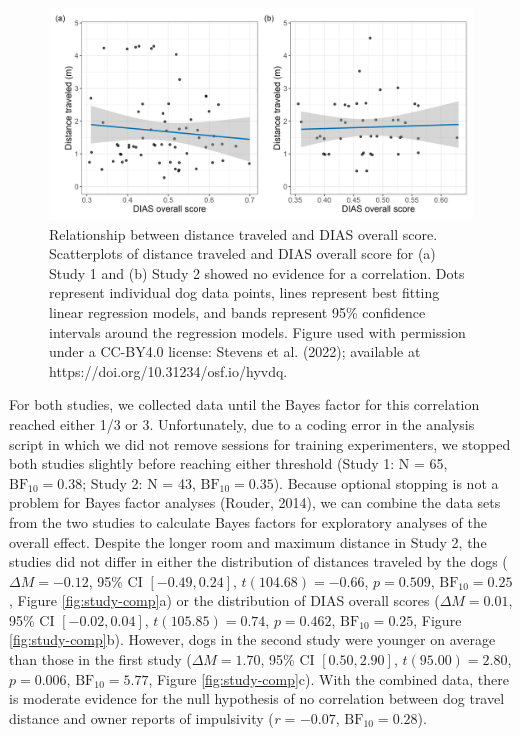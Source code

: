 \documentclass[
  pub,floatsintext]{apa6}
\begin{document}
\begin{figure}

{\centering \includegraphics[width=1\linewidth]{figures/distance_dias_overall} 

}

\caption{Relationship between distance traveled and DIAS overall score. Scatterplots of distance traveled and DIAS overall score for (a) Study 1 and (b) Study 2 showed no evidence for a correlation. Dots represent individual dog data points, lines represent best fitting linear regression models, and bands represent 95\% confidence intervals around the regression models. Figure used with permission under a CC-BY4.0 license: Stevens et al. (2022); available at https://doi.org/10.31234/osf.io/hyvdq.}\label{fig:dias}
\end{figure}

For both studies, we collected data until the Bayes factor for this correlation reached either 1/3 or 3. Unfortunately, due to a coding error in the analysis script in which we did not remove sessions for training experimenters, we stopped both studies slightly before reaching either threshold (Study 1: N = 65, \(\mathrm{BF}_{\textrm{10}} = 0.38\); Study 2: N = 43, \(\mathrm{BF}_{\textrm{10}} = 0.35\)). Because optional stopping is not a problem for Bayes factor analyses (Rouder, 2014), we can combine the data sets from the two studies to calculate Bayes factors for exploratory analyses of the overall effect. Despite the longer room and maximum distance in Study 2, the studies did not differ in either the distribution of distances traveled by the dogs (\(\Delta M = -0.12\), 95\% CI \([-0.49, 0.24]\), \(t(104.68) = -0.66\), \(p = 0.509\), \(\mathrm{BF}_{\textrm{10}} = 0.25\), Figure \ref{fig:study-comp}a) or the distribution of DIAS overall scores (\(\Delta M = 0.01\), 95\% CI \([-0.02, 0.04]\), \(t(105.85) = 0.74\), \(p = 0.462\), \(\mathrm{BF}_{\textrm{10}} = 0.25\), Figure \ref{fig:study-comp}b). However, dogs in the second study were younger on average than those in the first study (\(\Delta M = 1.70\), 95\% CI \([0.50, 2.90]\), \(t(95.00) = 2.80\), \(p = 0.006\), \(\mathrm{BF}_{\textrm{10}} = 5.77\), Figure \ref{fig:study-comp}c). With the combined data, there is moderate evidence for the null hypothesis of no correlation between dog travel distance and owner reports of impulsivity (\emph{r} = \(-0.07\), \(\mathrm{BF}_{\textrm{10}} = 0.28\)).
\end{document}
